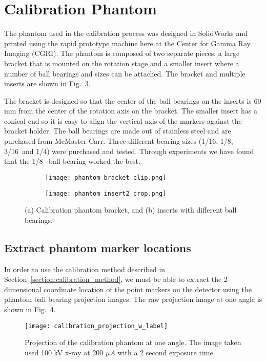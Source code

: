 \section{Calibration Phantom}
The phantom used in the calibration process was designed in SolidWorks and printed using the rapid prototype machine here at the Center for Gamma Ray Imaging (CGRI).  The phantom is composed of two separate pieces: a large bracket that is mounted on the rotation stage and a smaller insert where a number of ball bearings and sizes can be attached.  The bracket and multiple inserts are shown in Fig.~\ref{fig:calibration_phantom}.

The bracket is designed so that the center of the ball bearings on the inserts is 60 mm from the center of the rotation axis on the bracket.  The smaller insert has a conical end so it is easy to align the vertical axis of the markers against the bracket holder.  The ball bearings are made out of stainless steel and are purchased from McMaster-Carr.  Three different bearing sizes (1/16\inches, 1/8\inches,~ 3/16\inches ~and 1/4\inches) were purchased and tested.  Through experiments we have found that the 1/8\inches~ ball bearing worked the best.
%
\begin{figure}[ht]
	\begin{subfigure}[b]{0.3\linewidth}
	\texttt{[image: phantom\_bracket\_clip.png]}
	\label{fig:calibration_phantom_bracket}
	\caption{}
	\end{subfigure}
\hspace{0.2cm}
	\begin{subfigure}[b]{0.3\linewidth}
	\texttt{[image: phantom\_insert2\_crop.png]}
	\label{fig:calibration_phantom_insert}
	\caption{}
	\end{subfigure}
\caption{(a) Calibration phantom bracket, and (b) inserts with different ball bearings.}
\label{fig:calibration_phantom}
\end{figure}

\subsection{Extract phantom marker locations}
In order to use the calibration method described in Section~\ref{section:calibration_method}, we must be able to extract the 2-dimensional coordinate location of the point markers on the detector using the phantom ball bearing projection images.  The raw projection image at one angle is shown in Fig.~\ref{fig:calibration_projection}.
%
\begin{figure}[ht]
\centering
\texttt{[image: calibration\_projection\_w\_label]}
\caption{Projection of the calibration phantom at one angle.  The image taken used 100 kV x-ray at 200 $\mu A$ with a 2 second exposure time.}
\label{fig:calibration_projection}
\end{figure}

